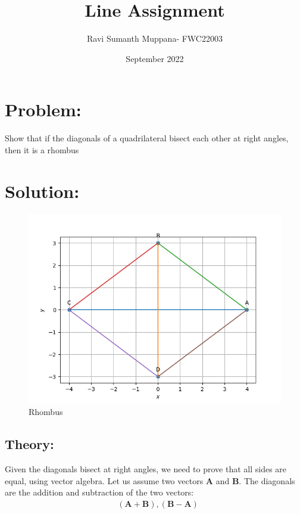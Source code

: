 \documentclass[a4paper,12pt,twocolumn]{article}
\title{Line Assignment}
\author{Ravi Sumanth Muppana- FWC22003}
\date{September 2022}
\let\vec\mathbf
\begin{document}
\maketitle
\section{Problem:}
Show that if the diagonals of a quadrilateral bisect each other at right angles, then it is a rhombus
\maketitle
\section{Solution:}
\begin{figure}
	\includegraphics[width=\linewidth]{rhombus.png}
	\caption{Rhombus}
\end{figure}
\subsection{Theory:}
Given the diagonals bisect at right angles, we need to prove that all sides are equal, using vector algebra. Let us assume two vectors $\vec{A}$ and $\vec{B}$. The diagonals are the addition and subtraction of the two vectors:
\begin{align*}
&(\boldsymbol{A+B}), (\boldsymbol{B-A})
\end{align*}
\end{document}
